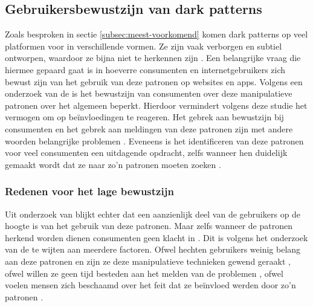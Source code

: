 \subsection{Gebruikersbewustzijn van dark patterns}
\label{subsec:bewustzijn-gebruikers}

\vspace{1em}

Zoals besproken in sectie \ref{subsec:meest-voorkomend} komen dark patterns op veel platformen voor in verschillende vormen. Ze zijn vaak verborgen en subtiel ontworpen, waardoor ze bijna niet te herkennen zijn \autocite{Commissie2022}. Een belangrijke vraag die hiermee gepaard gaat is in hoeverre consumenten en internetgebruikers zich bewust zijn van het gebruik van deze patronen op websites en apps. Volgens een onderzoek van de \textcite{Commissie2022} is het bewustzijn van consumenten over deze manipulatieve patronen over het algemeen beperkt. Hierdoor vermindert volgens deze studie het vermogen om op beïnvloedingen te reageren. Het gebrek aan bewustzijn bij consumenten en het gebrek aan meldingen van deze patronen zijn met andere woorden belangrijke problemen \autocite{Commissie2022}. Eveneens is het identificeren van deze patronen voor veel consumenten een uitdagende opdracht, zelfs wanneer hen duidelijk gemaakt wordt dat ze naar zo’n patronen moeten zoeken \autocite{Commissie2022}. 

\vspace{1em}

\subsubsection{Redenen voor het lage bewustzijn}

Uit onderzoek van \autocite{BongardBlanchy2021} blijkt echter dat een aanzienlijk deel van de gebruikers op de hoogte is van het gebruik van deze patronen. Maar zelfs wanneer de patronen herkend worden dienen consumenten geen klacht in \autocite{Commissie2022}. Dit is volgens het onderzoek van de \textcite{Commissie2022} te wijten aan meerdere factoren. Ofwel hechten gebruikers weinig belang aan deze patronen en zijn ze deze manipulatieve technieken gewend geraakt \autocite{Commissie2022, OECD2022}, ofwel willen ze geen tijd besteden aan het melden van de problemen \autocite{Commissie2022}, ofwel voelen mensen zich beschaamd over het feit dat ze beïnvloed werden door zo’n patronen \autocite{Commissie2022}.

\vspace{1em}

